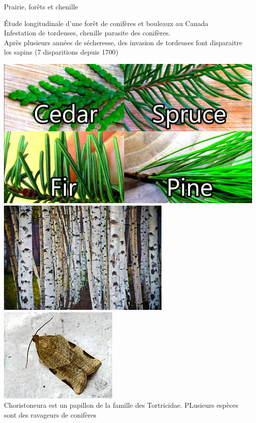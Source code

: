 \documentclass[11,aspectratio=1610]{beamer}
\begin{document}
\begin{frame}{Prairie, forêts et chenille}


Étude longitudinale d'une forêt de conifères et bouleaux au Canada \\
\vfill
Infestation de \alert{tordeuses}, chenille parasite des conifères.\\
\vfill
Après plusieurs années de sécheresse, des invasion de tordeuses font disparaitre les sapins (7 disparitions depuis 1700)
\vfill



\centering 
\includegraphics[height=0.3\textheight]{img/fir_spruce_pine_cedar.jpg}
\includegraphics[height=0.3\textheight]{img/birch.jpg}
\includegraphics[height=0.3\textheight]{img/spruce_budworm.jpg}\\
\tiny{Choristoneura est un papillon de la famille des Tortricidae. PLusieurs espèces sont des ravageurs de conifères}

\vfill

\end{frame}
\end{document}
